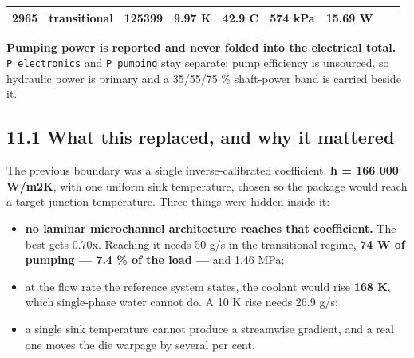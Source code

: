 \documentclass[10pt,]{article}
\providecommand{\tightlist}{%
  \setlength{\itemsep}{0pt}\setlength{\parskip}{0pt}}
\begin{document}
\begin{longtable}[]{@{}lllllllll@{}}
\begin{minipage}[t]{0.08\columnwidth}
2965\strut
\end{minipage} & \begin{minipage}[t]{0.08\columnwidth}\raggedright
transitional\strut
\end{minipage} & \begin{minipage}[t]{0.08\columnwidth}\raggedright
125399\strut
\end{minipage} & \begin{minipage}[t]{0.08\columnwidth}\raggedright
9.97 K\strut
\end{minipage} & \begin{minipage}[t]{0.08\columnwidth}\raggedright
42.9 C\strut
\end{minipage} & \begin{minipage}[t]{0.08\columnwidth}\raggedright
574 kPa\strut
\end{minipage} & \begin{minipage}[t]{0.08\columnwidth}\raggedright
15.69 W\strut
\end{minipage}\tabularnewline
\bottomrule
\end{longtable}

\textbf{Pumping power is reported and never folded into the electrical
total.} \texttt{P\_electronics} and \texttt{P\_pumping} stay separate;
pump efficiency is unsourced, so hydraulic power is primary and a
35/55/75 \% shaft-power band is carried beside it.

\hypertarget{what-this-replaced-and-why-it-mattered}{%
\subsection{11.1 What this replaced, and why it
mattered}\label{what-this-replaced-and-why-it-mattered}}

The previous boundary was a single inverse-calibrated coefficient,
\textbf{h = 166 000 W/m2K}, with one uniform sink temperature, chosen so
the package would reach a target junction temperature. Three things were
hidden inside it:

\begin{itemize}
\tightlist
\item
  \textbf{no laminar microchannel architecture reaches that
  coefficient.} The best gets 0.70x. Reaching it needs 50 g/s in the
  transitional regime, \textbf{74 W of pumping --- 7.4 \% of the load
  ---} and 1.46 MPa;
\item
  at the flow rate the reference system states, the coolant would rise
  \textbf{168 K}, which single-phase water cannot do. A 10 K rise needs
  26.9 g/s;
\item
  a single sink temperature cannot produce a streamwise gradient, and a
  real one moves the die warpage by several per cent.
\end{itemize}
\end{document}
